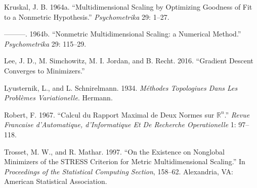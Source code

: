\documentclass[
  12pt,
]{article}
\newlength{\cslhangindent}
\newenvironment{CSLReferences}[2] %
 {\begin{list}{}{%
  \setlength{\itemindent}{0pt}
  \setlength{\leftmargin}{0pt}
  \setlength{\parsep}{0pt}
  \ifodd #1
   \setlength{\leftmargin}{\cslhangindent}
   \setlength{\itemindent}{-1\cslhangindent}
  \fi
  \setlength{\itemsep}{#2\baselineskip}}}
 {\end{list}}
\begin{document}
\begin{CSLReferences}{1}{0}
Kruskal, J. B. 1964a. {``{Multidimensional Scaling by Optimizing Goodness of Fit to a Nonmetric Hypothesis}.''} \emph{Psychometrika} 29: 1--27.

---------. 1964b. {``{Nonmetric Multidimensional Scaling: a Numerical Method}.''} \emph{Psychometrika} 29: 115--29.

Lee, J. D., M. Simchowitz, M. I. Jordan, and B. Recht. 2016. {``{Gradient Descent Converges to Minimizers}.''}

Lyusternik, L., and L. Schnirelmann. 1934. \emph{M{é}thodes Topologiues Dans Les Probl{è}mes Variationelle}. Hermann.

Robert, F. 1967. {``{Calcul du Rapport Maximal de Deux Normes sur \(\mathbb{R}^n\)}.''} \emph{Revue Francaise d'Automatique, d'Informatique Et De Recherche Operationelle} 1: 97--118.

Trosset, M. W., and R. Mathar. 1997. {``{On the Existence on Nonglobal Minimizers of the STRESS Criterion for Metric Multidimensional Scaling}.''} In \emph{Proceedings of the Statistical Computing Section}, 158--62. Alexandria, VA: American Statistical Association.

\end{CSLReferences}
\end{document}
